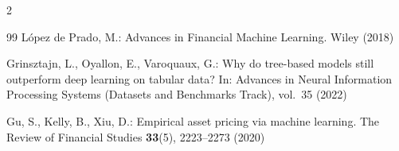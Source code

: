 \documentclass[runningheads]{llncs}
\begin{document}
{\begin{multicols}{2}
\begin{thebibliography}{99}
L\'opez de Prado, M.: Advances in Financial Machine Learning. Wiley (2018)

Grinsztajn, L., Oyallon, E., Varoquaux, G.: Why do tree-based models still outperform deep learning on tabular data? In: Advances in Neural Information Processing Systems (Datasets and Benchmarks Track), vol.~35 (2022)

Gu, S., Kelly, B., Xiu, D.: Empirical asset pricing via machine learning. The Review of Financial Studies \textbf{33}(5), 2223--2273 (2020)

\end{thebibliography}
\end{multicols}
}
\end{document}
